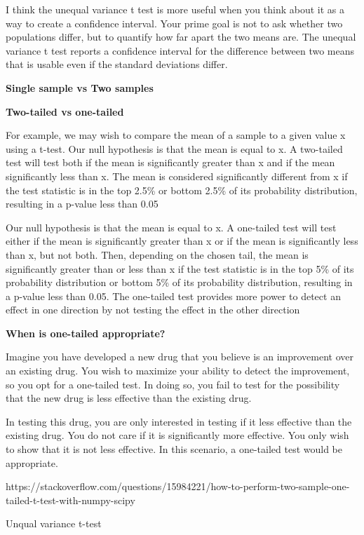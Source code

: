 \documentclass[11pt]{article}
\begin{document}
I think the unequal variance t test is more useful when you think about
it as a way to create a confidence interval. Your prime goal is not to
ask whether two populations differ, but to quantify how far apart the
two means are. The unequal variance t test reports a confidence interval
for the difference between two means that is usable even if the standard
deviations differ.

\textbf{Single sample vs Two samples}

\textbf{Two-tailed vs one-tailed}

For example, we may wish to compare the mean of a sample to a given
value x using a t-test. Our null hypothesis is that the mean is equal to
x. A two-tailed test will test both if the mean is significantly greater
than x and if the mean significantly less than x. The mean is considered
significantly different from x if the test statistic is in the top 2.5\%
or bottom 2.5\% of its probability distribution, resulting in a p-value
less than 0.05

Our null hypothesis is that the mean is equal to x. A one-tailed test
will test either if the mean is significantly greater than x or if the
mean is significantly less than x, but not both. Then, depending on the
chosen tail, the mean is significantly greater than or less than x if
the test statistic is in the top 5\% of its probability distribution or
bottom 5\% of its probability distribution, resulting in a p-value less
than 0.05. The one-tailed test provides more power to detect an effect
in one direction by not testing the effect in the other direction

\textbf{When is one-tailed appropriate?}

Imagine you have developed a new drug that you believe is an improvement
over an existing drug. You wish to maximize your ability to detect the
improvement, so you opt for a one-tailed test. In doing so, you fail to
test for the possibility that the new drug is less effective than the
existing drug.

In testing this drug, you are only interested in testing if it less
effective than the existing drug. You do not care if it is significantly
more effective. You only wish to show that it is not less effective. In
this scenario, a one-tailed test would be appropriate.

https://stackoverflow.com/questions/15984221/how-to-perform-two-sample-one-tailed-t-test-with-numpy-scipy

Unqual variance t-test
\end{document}
